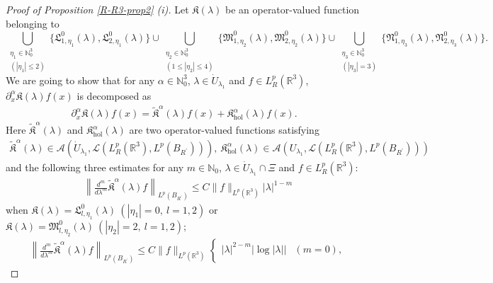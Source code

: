 \documentclass[dvipdfmx,12pt]{article}
\begin{document}
\begin{proof}[Proof of Proposition \ref{R-R3-prop2} {\rm (i)}]
Let $\mathfrak{K}(\lambda)$ be an operator-valued function belonging to 
$$
\bigcup_{\substack{\eta_1\in \mathbb{N}_0^3 \\ (|\eta_1|\le2)} }\{\mathfrak{L}_{1,\eta_1}^0(\lambda),\mathfrak{L}_{2,\eta_1}^0(\lambda)\} \cup \bigcup_{\substack{\eta_2\in \mathbb{N}_0^3 \\ (1\le |\eta_2|\le4)} }\{\mathfrak{M}_{1,\eta_2}^0(\lambda),\mathfrak{M}_{2,\eta_2}^0(\lambda)\} \cup \bigcup_{\substack{\eta_3\in \mathbb{N}_0^3 \\ (|\eta_3|=3)} }\{\mathfrak{N}_{1,\eta_3}^0(\lambda), \mathfrak{N}_{2,\eta_3}^0(\lambda)\}.
$$
We are going to show that for any $\alpha\in\mathbb{N}_0^3$, $\lambda\in\Dot{U}_{\lambda_1}$ and $f\in L_R^p(\mathbb{R}^3)$, $\partial_x^{\alpha} \mathfrak{K}(\lambda)f(x)$ is decomposed as
\begin{align}\label{pr-R-R3-prop2-4}
\partial_x^{\alpha} \mathfrak{K}(\lambda)f(x)=\widetilde{\mathfrak{K}}^\alpha(\lambda)f(x)+\mathfrak{K}_{\mathrm{hol}}^{\alpha}(\lambda)f(x).
\end{align}
Here $\widetilde{\mathfrak{K}}^\alpha(\lambda)$ and $\mathfrak{K}_{\mathrm{hol}}^{\alpha}(\lambda)$ are two operator-valued functions satisfying 
\begin{gather}\label{pr-R-R3-prop2-4-1} 
\widetilde{\mathfrak{K}}^\alpha(\lambda)\in \mathcal{A}(\dot{U}_{\lambda_1}, \mathcal{L}(L_R^{p}(\mathbb{R}^3), L^p(B_{R^\prime}) ) ),~\mathfrak{K}_{\mathrm{hol}}^{\alpha}(\lambda)\in \mathcal{A}(U_{\lambda_1}, \mathcal{L}(L_R^{p}(\mathbb{R}^3), L^p(B_{R^\prime}) ) ) 
\end{gather} 
and the following three estimates for any $m\in\mathbb{N}_0$, $\lambda\in \Dot{U}_{\lambda_1}\cap \Xi$ and $f\in L_R^p(\mathbb{R}^3)$:
\begin{align} 
&\left\|\frac{d^m }{d\lambda^m}\widetilde{\mathfrak{K}}^\alpha(\lambda)f \right\|_{L^p(B_{R^\prime})}
\leq C\|f\|_{L^p(\mathbb{R}^3)} 
|\lambda|^{1-m}
\label{pr-R-R3-prop2-5} 
\end{align}
when $\mathfrak{K}(\lambda)=\mathfrak{L}_{l,\eta_1}^0(\lambda)~(|\eta_1|=0,~l=1,2)$ or $\mathfrak{K}(\lambda)= \mathfrak{M}_{l,\eta_2}^0(\lambda)~(|\eta_2|=2,~l=1,2)$;
\begin{align}
&\left\|\frac{d^m }{d\lambda^m}\widetilde{\mathfrak{K}}^\alpha(\lambda)f \right\|_{L^p(B_{R^\prime})}
\leq C\|f\|_{L^p(\mathbb{R}^3)} 
\begin{cases}
|\lambda|^{2-m}\left|\log |\lambda|\right| & (m=0), \\

\end{cases}
\end{align}
\end{proof}
\end{document}
